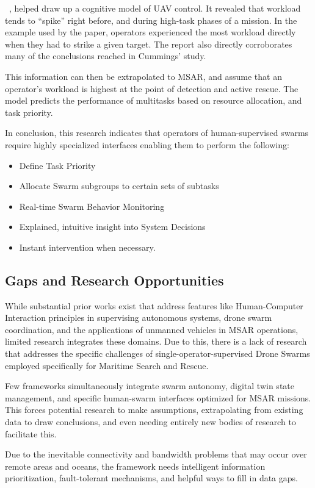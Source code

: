 ~\cite{wickens2011cognitive}, helped draw up a cognitive model of UAV control.
It revealed that workload tends to ``spike'' right before, and during high-task phases of a mission.
In the example used by the paper, operators experienced the most workload directly when they had to strike a given target.
The report also directly corroborates many of the conclusions reached in Cummings' study.

This information can then be extrapolated to MSAR, and assume that an operator's workload is highest at the point of detection and active rescue.
The model predicts the performance of multitasks based on resource allocation, and task priority.

In conclusion, this research indicates that operators of human-supervised swarms require highly specialized interfaces enabling them to perform the following:
\begin{itemize}
    \item Define Task Priority
    \item Allocate Swarm subgroups to certain sets of subtasks
    \item Real-time Swarm Behavior Monitoring
    \item Explained, intuitive insight into System Decisions
    \item Instant intervention when necessary.
\end{itemize}

\subsection{Gaps and Research Opportunities}\label{subsec:gaps-and-research-opportunities}
While substantial prior works exist that address features like Human-Computer Interaction principles in supervising autonomous systems, drone swarm coordination, and the applications of unmanned vehicles in MSAR operations, limited research integrates these domains.
Due to this, there is a lack of research that addresses the specific challenges of single-operator-supervised Drone Swarms employed specifically for Maritime Search and Rescue.

Few frameworks simultaneously integrate swarm autonomy, digital twin state management, and specific human-swarm interfaces optimized for MSAR missions.
This forces potential research to make assumptions, extrapolating from existing data to draw conclusions, and even needing entirely new bodies of research to facilitate this.

Due to the inevitable connectivity and bandwidth problems that may occur over remote areas and oceans, the framework needs intelligent information prioritization, fault-tolerant mechanisms, and helpful ways to fill in data gaps.

